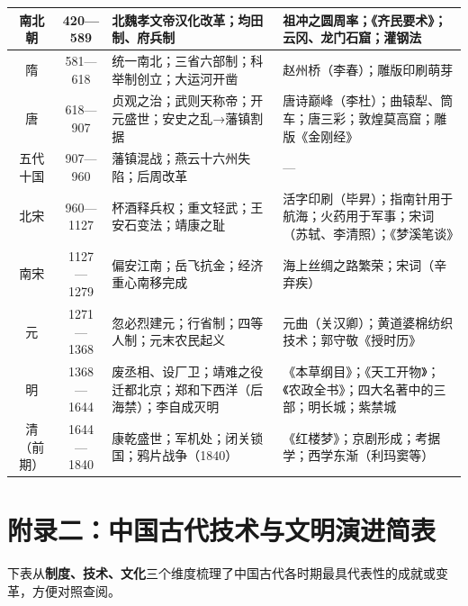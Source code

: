 \documentclass[a4paper,12pt]{ctexart}
\begin{document}
{\begin{center}
\begin{tabular}{|c|c|p{6cm}|p{5cm}|}
\hline
南北朝 & 420—589 & 北魏孝文帝汉化改革；均田制、府兵制 & 祖冲之圆周率；《齐民要术》；云冈、龙门石窟；灌钢法 \\
\hline
隋 & 581—618 & 统一南北；三省六部制；科举制创立；大运河开凿 & 赵州桥（李春）；雕版印刷萌芽 \\
\hline
唐 & 618—907 & 贞观之治；武则天称帝；开元盛世；安史之乱→藩镇割据 & 唐诗巅峰（李杜）；曲辕犁、筒车；唐三彩；敦煌莫高窟；雕版《金刚经》 \\
\hline
五代十国 & 907—960 & 藩镇混战；燕云十六州失陷；后周改革 & — \\
\hline
北宋 & 960—1127 & 杯酒释兵权；重文轻武；王安石变法；靖康之耻 & 活字印刷（毕昇）；指南针用于航海；火药用于军事；宋词（苏轼、李清照）；《梦溪笔谈》 \\
\hline
南宋 & 1127—1279 & 偏安江南；岳飞抗金；经济重心南移完成 & 海上丝绸之路繁荣；宋词（辛弃疾） \\
\hline
元 & 1271—1368 & 忽必烈建元；行省制；四等人制；元末农民起义 & 元曲（关汉卿）；黄道婆棉纺织技术；郭守敬《授时历》 \\
\hline
明 & 1368—1644 & 废丞相、设厂卫；靖难之役迁都北京；郑和下西洋（后海禁）；李自成灭明 & 《本草纲目》；《天工开物》；《农政全书》；四大名著中的三部；明长城；紫禁城 \\
\hline
清（前期） & 1644—1840 & 康乾盛世；军机处；闭关锁国；鸦片战争（1840） & 《红楼梦》；京剧形成；考据学；西学东渐（利玛窦等） \\
\hline
\end{tabular}
\end{center}
}

\newpage

\section*{\textcolor{blue!70!black}{附录二：中国古代技术与文明演进简表}}

下表从\textbf{制度、技术、文化}三个维度梳理了中国古代各时期最具代表性的成就或变革，方便对照查阅。
\end{document}
